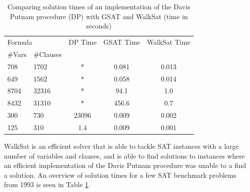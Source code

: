 \begin{table}
    \centering
    \begin{tabular}{l l c c c}
    \toprule
        \multicolumn{2}{l}{Formula} & DP Time & GSAT Time & WalkSat Time \\
        \#Vars & \#Clauses & & & \\
        \midrule
        708 & 1702 & * & 0.081 & 0.013 \\
        649 & 1562 & * & 0.058 & 0.014 \\
        8704 & 32316 & * & 94.1 & 1.0 \\
        8432 & 31310 & * & 456.6 & 0.7 \\
        300 & 730 & 23096 & 0.009 & 0.002 \\
        125 & 310 & 1.4 & 0.009 & 0.001 \\
        \bottomrule
    \end{tabular}
    \caption[Comparing DP, GSAT and WalkSat]
    {Comparing solution times of an implementation of
    the Davis Putnam procedure (DP) with GSAT and WalkSat 
    (time in seconds) \cite{selman1993local}}
    \label{tab:walksat_times}
\end{table}

WalkSat is an efficient solver that is able to tackle SAT instances with a large
number of variables and clauses, and is able to find solutions to instances
where an efficient implementation of the Davis Putnam procedure was unable
to a find a solution. An overview of solution times for a few SAT benchmark
problems from 1993 is seen in Table \ref{tab:walksat_times}.